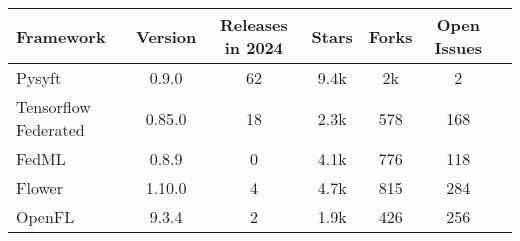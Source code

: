\begin{changemargin}{0cm}{0cm}
    \centering
    \begin{tabular}{|m{2.4cm}||c|c|c|c|c|c|}
        \hline
            \textbf{Framework} & \textbf{Version} & \textbf{Releases in 2024} & \textbf{Stars} & \textbf{Forks} & \textbf{Open Issues} \\
        \hline
            Pysyft \cite{fl_framework:pysyft} & 0.9.0 & 62 & 9.4k & 2k & 2
        \\
        \hline
            Tensorflow Federated \cite{fl_framework:tensorflow_federated} & 0.85.0 & 18 & 2.3k & 578 & 168
        \\
        \hline
            FedML \cite{fl_framework:fedml} & 0.8.9 & 0 & 4.1k & 776 & 118
        \\
        \hline
            Flower \cite{fl_framework:flower} & 1.10.0 & 4 & 4.7k & 815 & 284
        \\
        \hline
            OpenFL \cite{fl_framework:openfl} & 9.3.4 & 2 & 1.9k & 426 & 256
        \\
        \hline
    \end{tabular}
    \label{table:updated_fl_framework_comparison}
\end{changemargin}
